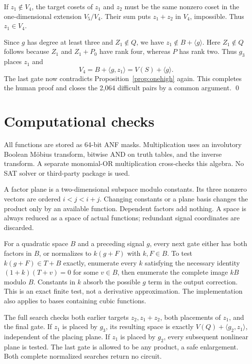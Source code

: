 \documentclass[11pt,a4paper]{article}
\begin{document}
If $z_1\notin V_4$, the target cosets of $z_1$ and $z_2$ must be the same nonzero coset in the one-dimensional extension $V_5/V_4$. Their sum puts $z_1+z_2$ in $V_4$, impossible. Thus $z_1\in V_4$.

Since $g$ has degree at least three and $Z_1\notin Q$, we have $z_1\notin B+\langle g\rangle$. Here $Z_1\notin Q$ follows because $Z_1$ and $Z_1+P_0$ have rank four, whereas $P$ has rank two. Thus $g_3$ places $z_1$ and
\[
V_4=B+\langle g,z_1\rangle=V(S)+\langle g\rangle.
\]
The last gate now contradicts Proposition~\ref{prop:onehigh} again. This completes the human proof and closes the 2,064 difficult pairs by a common argument. \qed

\section{Computational checks}
All functions are stored as 64-bit ANF masks. Multiplication uses an involutory Boolean M\"obius transform, bitwise AND on truth tables, and the inverse transform. A separate monomial-OR multiplication cross-checks this algebra. No SAT solver or third-party package is used.

A factor plane is a two-dimensional subspace modulo constants. Its three nonzero vectors are ordered $i<j<i+j$. Changing constants or a plane basis changes the product only by an available function. Dependent factors add nothing. A space is always reduced as a space of actual functions; redundant signal coordinates are discarded.

For a quadratic space $B$ and a preceding signal $g$, every next gate either has both factors in $B$, or normalizes to $k(g+F)$ with $k,F\in B$. To test $k(g+F)\in T+B$ exactly, enumerate every $k$ satisfying the necessary identity $(1+k)(T+v)=0$ for some $v\in B$, then enumerate the complete image $kB$ modulo $B$. Constants in $k$ absorb the possible $g$ term in the output correction. This is an exact finite test, not a derivative approximation. The implementation also applies to bases containing cubic functions.

The full search checks both earlier targets $z_2,z_1+z_2$, both placements of $z_1$, and the final gate. If $z_1$ is placed by $g_3$, its resulting space is exactly $V(Q)+\langle g_2,z_1\rangle$, independent of the placing plane. If $z_1$ is placed by $g_2$, every subsequent nonlinear plane is tested. The last gate is allowed to be any product, a safe enlargement. Both complete normalized searches return no circuit.
\end{document}
